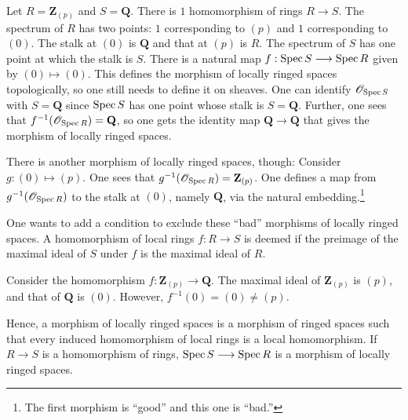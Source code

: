 \documentclass [11 pt, oneside, margin = 1 in] {article}
\begin{document}
\begin{example}[ ]\label{}\text{}
Let $R= \mathbf{Z}_{(p)}$ and $S=\mathbf{Q}$. There is $1$ homomorphism of rings $R\longrightarrow S$. The spectrum of $R$ has two points: $1$ corresponding to $(p)$ and $1$ corresponding to $ (0)$. The stalk at $(0)$ is $\mathbf{Q}$ and that at $(p)$ is $R$. The spectrum of $S$ has one point at which the stalk is $S$. There is a natural map $f:\operatorname{Spec} S \longrightarrow \operatorname{Spec} R$ given by $(0)\longmapsto  (0)$. This defines the morphism of locally ringed spaces topologically, so one still needs to define it on sheaves. One can identify $\mathscr{O}_{\operatorname{Spec} S}$ with $S=\mathbf{Q}$ since $\operatorname{Spec} S$ has one point whose stalk is $S=\mathbf{Q}$. Further, one sees that $f^{-1}(\mathscr{O}_{\operatorname{Spec} R})= \mathbf{Q}$, so one gets the identity map $\mathbf{Q}\longrightarrow \mathbf{Q}$ that gives the morphism of locally ringed spaces.

There is another morphism of locally ringed spaces, though: Consider $g:(0)\longmapsto  (p)$. One sees that $g^{-1}(\mathscr{O}_{\operatorname{Spec} R})= \mathbf{Z}_{(p)}$. One defines a map from $g^{-1}(\mathscr{O}_{\operatorname{Spec} R})$ to the stalk at $(0)$, namely $\mathbf{Q}$, via the natural embedding.\footnote{The first morphism is ``good'' and this one is ``bad.''} 
\end{example}

One wants to add a condition to exclude these ``bad'' morphisms of locally ringed spaces. A homomorphism of local rings $f:R\longrightarrow S$ is deemed  if the preimage of the maximal ideal of $S$ under $f$ is the maximal ideal of $R$.

\begin{example}\label{}\text{}
Consider the homomorphism $f:\mathbf{Z}_{(p)} \longrightarrow \mathbf{Q}$. The maximal ideal of $ \mathbf{Z}_{(p)}$ is $(p)$, and that of $\mathbf{Q}$ is $(0)$. However, $f^{-1}(0)=  (0)\ne  (p)$. 
\end{example}

Hence, a morphism of locally ringed spaces is a morphism of ringed spaces such that every induced homomorphism of local rings is a local homomorphism. If $R\longrightarrow S$ is a homomorphism of rings, $\operatorname{Spec} S\longrightarrow \operatorname{Spec} R$ is a morphism of locally ringed spaces.
\end{document}
